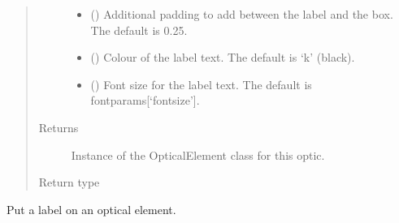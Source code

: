 \documentclass[letterpaper,10pt,english]{sphinxmanual}
\begin{document}
\begin{fulllineitems}
\begin{fulllineitems}
\begin{quote}
\begin{description}
\begin{itemize}
\item {} 
\sphinxAtStartPar
{} (\sphinxstyleliteralemphasis{\sphinxupquote{, }}) \textendash{} Additional padding to add between the label and the box. The default is 0.25.

\item {} 
\sphinxAtStartPar
{} (\sphinxstyleliteralemphasis{\sphinxupquote{, }}) \textendash{} Colour of the label text. The default is ‘k’ (black).

\item {} 
\sphinxAtStartPar
{} (\sphinxstyleliteralemphasis{\sphinxupquote{, }}) \textendash{} Font size for the label text. The default is fontparams{[}‘fontsize’{]}.

\end{itemize}

\item[{Returns}] \leavevmode
\sphinxAtStartPar
Instance of the OpticalElement class for this optic.

\item[{Return type}] \leavevmode
\sphinxAtStartPar
{\hyperref[\detokenize{index:pyopticaltable.OpticalElement}]{}}

\end{description}\end{quote}

\end{fulllineitems}


\begin{fulllineitems}
\label{\detokenize{index:pyopticaltable.OpticalTable.set_label}}
\sphinxAtStartPar
Put a label on an optical element.


\end{fulllineitems}
\end{fulllineitems}
\end{document}
